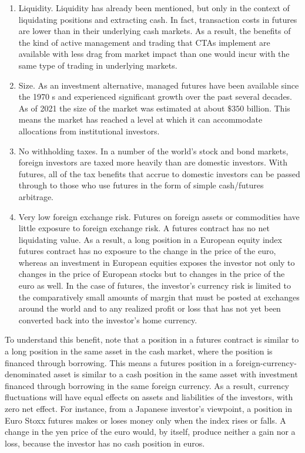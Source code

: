 \documentclass[11pt]{article}
\begin{document}
\begin{enumerate}
  \item Liquidity. Liquidity has already been mentioned, but only in the context of liquidating positions and extracting cash. In fact, transaction costs in futures are lower than in their underlying cash markets. As a result, the benefits of the kind of active management and trading that CTAs implement are available with less drag from market impact than one would incur with the same type of trading in underlying markets.

  \item Size. As an investment alternative, managed futures have been available since the 1970 s and experienced significant growth over the past several decades. As of 2021 the size of the market was estimated at about $\$ 350$ billion. This means the market has reached a level at which it can accommodate allocations from institutional investors.

  \item No withholding taxes. In a number of the world's stock and bond markets, foreign investors are taxed more heavily than are domestic investors. With futures, all of the tax benefits that accrue to domestic investors can be passed through to those who use futures in the form of simple cash/futures arbitrage.

  \item Very low foreign exchange risk. Futures on foreign assets or commodities have little exposure to foreign exchange risk. A futures contract has no net liquidating value. As a result, a long position in a European equity index futures contract has no exposure to the change in the price of the euro, whereas an investment in European equities exposes the investor not only to changes in the price of European stocks but to changes in the price of the euro as well. In the case of futures, the investor's currency risk is limited to the comparatively small amounts of margin that must be posted at exchanges around the world and to any realized profit or loss that has not yet been converted back into the investor's home currency.

\end{enumerate}

To understand this benefit, note that a position in a futures contract is similar to a long position in the same asset in the cash market, where the position is financed through borrowing. This means a futures position in a foreign-currency-denominated asset is similar to a cash position in the same asset with investment financed through borrowing in the same foreign currency. As a result, currency fluctuations will have equal effects on assets and liabilities of the investors, with zero net effect. For instance, from a Japanese investor's viewpoint, a position in Euro Stoxx futures makes or loses money only when the index rises or falls. A change in the yen price of the euro would, by itself, produce neither a gain nor a loss, because the investor has no cash position in euros.
\end{document}
